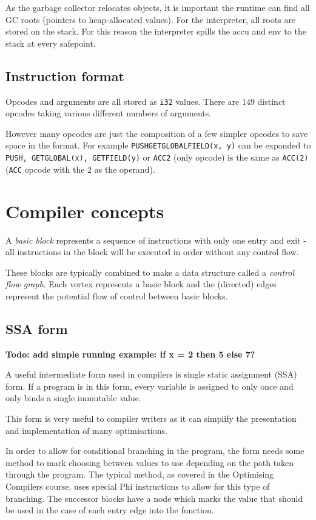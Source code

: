As the garbage collector relocates objects, it is important the runtime can find all GC roots
(pointers to heap-allocated values). For the interpreter, all roots are stored on the stack. For
this reason the interpreter spills the accu and env to the stack at every safepoint.

\subsection{Instruction format} \label{ocaml-bytecode-format}

Opcodes and arguments are all stored as \texttt{i32} values. There are 149 distinct opcodes taking
various
different numbers of arguments.

However many opcodes are just the composition of a few simpler opcodes to save space in the format.
For example \texttt{PUSHGETGLOBALFIELD(x, y)} can be expanded to \texttt{PUSH,
    GETGLOBAL(x), GETFIELD(y)} or \texttt{ACC2} (only opcode) is the same as \texttt{ACC(2)}
(\texttt{ACC} opcode with the 2 as the operand).

\section{Compiler concepts}

A \emph{basic block} represents a sequence of instructions with only one entry and exit - all
instructions
in the block will be executed in order without any control flow.

These blocks are typically combined to make a data structure called a \emph{control flow graph}.
Each vertex represents a basic block and the (directed) edges represent the potential flow of
control between basic blocks.

\subsection{SSA form}

\textbf{Todo: add simple running example: if x = 2 then 5 else 7?}

A useful intermediate form used in compilers is single static assignment (SSA) form. If a program
is in this form,
every variable is assigned to only once and only binds a single immutable value.

This form is very useful to compiler writers as it can simplify the presentation and implementation
of many optimisations.

In order to allow for conditional branching in the program, the form needs some method to mark
choosing between values to use depending on the path taken through the program. The typical
method, as covered in the Optimising Compilers course, uses special Phi instructions to allow for
this type
of branching. The successor blocks have a node which marks the value that should be used in the
case
of each entry edge into the function.

